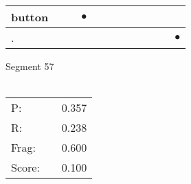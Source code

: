 \documentclass[landscape]{article}
\newcommand{\ssp}{\hspace{2pt}}
\newcommand{\mex}{\cellcolor{g}$\bullet$}
\begin{document}
\begin{tabular}{|l|p{10pt}|p{10pt}|p{10pt}|p{10pt}|p{10pt}|p{10pt}|p{10pt}|p{10pt}|p{10pt}|p{10pt}|p{10pt}|}
\hline
\ssp \cellcolor{ref2}button \ssp&\hspace{2pt}&\hspace{2pt}&\hspace{2pt}\mex&\hspace{2pt}&\hspace{2pt}&\hspace{2pt}&\hspace{2pt}&\hspace{2pt}&\hspace{2pt}&\hspace{2pt}&\hspace{2pt}\\
\hline
\ssp \cellcolor{ref10}. \ssp&\hspace{2pt}&\hspace{2pt}&\hspace{2pt}&\hspace{2pt}&\hspace{2pt}&\hspace{2pt}&\hspace{2pt}&\hspace{2pt}&\hspace{2pt}&\hspace{2pt}&\hspace{2pt}\mex\\
\hline
\end{tabular}

\vspace{6pt}
\noindent Segment 57\\\\
\noindent\begin{tabular}{lm{12pt}r}
\hline
P:&&0.357\\
R:&&0.238\\
Frag:&&0.600\\
Score:&&0.100\\
\end{tabular}

\newpage
\end{document}
